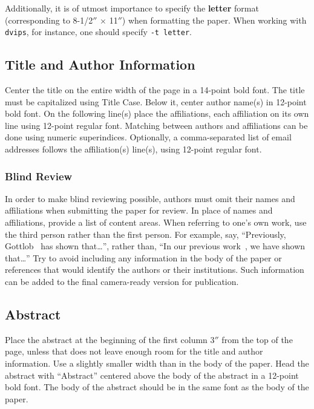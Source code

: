 \documentclass{article}
\begin{document}
Additionally, it is of utmost importance to specify the {\bf
letter} format (corresponding to 8-1/2$''$ $\times$ 11$''$) when
formatting the paper. When working with {\tt dvips}, for instance, one
should specify {\tt -t letter}.

\subsection{Title and Author Information}

Center the title on the entire width of the page in a 14-point bold
font. The title must be capitalized using Title Case. Below it, center author name(s) in 12-point bold font. On the following line(s) place the affiliations, each affiliation on its own line using 12-point regular font. Matching between authors and affiliations can be done using numeric superindices. Optionally, a comma-separated list of email addresses follows the affiliation(s) line(s), using 12-point regular font.

\subsubsection{Blind Review}

In order to make blind reviewing possible, authors must omit their
names and affiliations when submitting the paper for review. In place
of names and affiliations, provide a list of content areas. When
referring to one's own work, use the third person rather than the
first person. For example, say, ``Previously,
Gottlob~ has shown that\ldots'', rather
than, ``In our previous work~\cite{gottlob:nonmon}, we have shown
that\ldots'' Try to avoid including any information in the body of the
paper or references that would identify the authors or their
institutions. Such information can be added to the final camera-ready
version for publication.

\subsection{Abstract}

Place the abstract at the beginning of the first column 3$''$ from the
top of the page, unless that does not leave enough room for the title
and author information. Use a slightly smaller width than in the body
of the paper. Head the abstract with ``Abstract'' centered above the
body of the abstract in a 12-point bold font. The body of the abstract
should be in the same font as the body of the paper.
\end{document}
